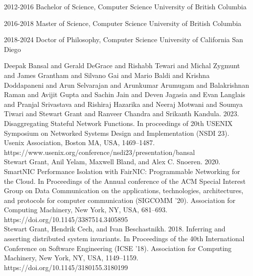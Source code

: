 \documentclass[12pt]{ucsddissertation}
\begin{document}
\begin{vita}
\noindent
\begin{cv}{}
\begin{cvlist}{}
\item[2012-2016] Bachelor of Science, Computer Science University of British Columbia
\item[2016-2018] Master of Science, Computer Science University of British Columbia
\item[2018-2024] Doctor of Philosophy, Computer Science University of California San Diego
\end{cvlist}
\end{cv}

\publications

\noindent Deepak Bansal and Gerald DeGrace and Rishabh Tewari and Michal Zygmunt and James Grantham
and Silvano Gai and Mario Baldi and Krishna Doddapaneni and Arun Selvarajan and Arunkumar Arumugam
and Balakrishnan Raman and Avijit Gupta and Sachin Jain and Deven Jagasia and Evan Langlais and
Pranjal Srivastava and Rishiraj Hazarika and Neeraj Motwani and Soumya Tiwari and Stewart Grant and
Ranveer Chandra and Srikanth Kandula. 2023. Disaggregating Stateful Network Functions. In
proceedings of 20th USENIX Symposium on Networked Systems Design and Implementation (NSDI 23).
Usenix Association, Boston MA, USA, 1469--1487.
https://www.usenix.org/conference/nsdi23/presentation/bansal \\

\noindent Stewart Grant, Anil Yelam, Maxwell Bland, and Alex C. Snoeren. 2020. SmartNIC Performance
Isolation with FairNIC: Programmable Networking for the Cloud. In Proceedings of the Annual
conference of the ACM Special Interest Group on Data Communication on the applications,
technologies, architectures, and protocols for computer communication (SIGCOMM '20). Association for
Computing Machinery, New York, NY, USA, 681–693. https://doi.org/10.1145/3387514.3405895 \\

\noindent Stewart Grant, Hendrik Cech, and Ivan Beschastnikh. 2018. Inferring and asserting
distributed system invariants. In Proceedings of the 40th International Conference on Software
Engineering (ICSE '18). Association for Computing Machinery, New York, NY, USA, 1149–1159.
https://doi.org/10.1145/3180155.3180199 \\


\end{vita}
\end{document}
